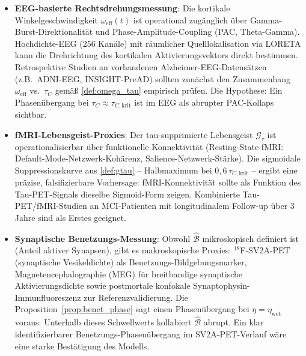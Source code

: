 ﻿\documentclass[12pt,a4paper]{article}
\theoremstyle{definition}
\begin{document}
	\begin{itemize}
		\item \textbf{EEG-basierte Rechtsdrehungsmessung}: Die kortikale Winkelgeschwindigkeit $\omega_{\mathrm{eff}}(t)$ ist operational zugänglich über Gamma-Burst-Direktionalität und Phase-Amplitude-Coupling (PAC, Theta-Gamma). Hochdichte-EEG (256 Kanäle) mit räumlicher Quelllokalisation via LORETA kann die Drehrichtung des kortikalen Aktivierungsvektors direkt bestimmen. Retrospektive Studien an vorhandenen Alzheimer-EEG-Datensätzen (z.B.\ ADNI-EEG, INSIGHT-PreAD) sollten zunächst den Zusammenhang $\omega_{\mathrm{eff}}$ vs.\ $\tau_C$ gemäß \cref{def:omega_tau} empirisch prüfen. Die Hypothese: Ein Phasenübergang bei $\tau_C \approx \tau_{C,\mathrm{krit}}$ ist im EEG als abrupter PAC-Kollaps sichtbar.
		\item \textbf{fMRI-Lebensgeist-Proxies}: Der tau-supprimierte Lebensgeist $\mathcal{G}_\tau$ ist operationalisierbar über funktionelle Konnektivität (Resting-State-fMRI: Default-Mode-Netzwerk-Kohärenz, Salience-Netzwerk-Stärke). Die sigmoidale Suppressionskurve aus \cref{def:gtau} -- Halbmaximum bei $0{,}6\,\tau_{C,\mathrm{krit}}$ -- ergibt eine präzise, falsifizierbare Vorhersage: fMRI-Konnektivität sollte als Funktion des Tau-PET-Signals dieselbe Sigmoid-Form zeigen. Kombinierte Tau-PET/fMRI-Studien an MCI-Patienten mit longitudinalem Follow-up über 3 Jahre sind als Erstes geeignet.
		\item \textbf{Synaptische Benetzungs-Messung}: Obwohl $\hat{\mathcal{B}}$ mikroskopisch definiert ist (Anteil aktiver Synapsen), gibt es makroskopische Proxies: ${}^{18}$F-SV2A-PET (synaptische Vesikeldichte) als Benetzungs-Bildgebungsmarker, Magnetencephalographie (MEG) für breitbandige synaptische Aktivierungsdichte sowie postmortale konfokale Synaptophysin-Immunfluoreszenz zur Referenzvalidierung. Die Proposition~\ref{prop:benet_phase} sagt einen Phasenübergang bei $\eta = \eta_{\mathrm{wet}}$ voraus: Unterhalb dieses Schwellwerts kollabiert $\hat{\mathcal{B}}$ abrupt. Ein klar identifizierbarer Benetzungs-Phasenübergang im SV2A-PET-Verlauf wäre eine starke Bestätigung des Modells.
	\end{itemize}
\end{document}
